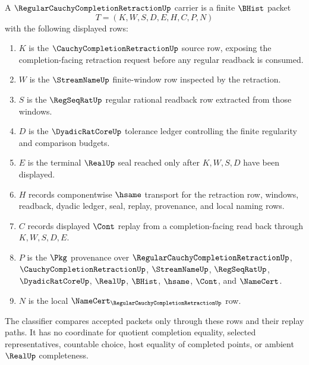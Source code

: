 \begin{definition}
\label{def:regular-cauchy-completion-retraction-carrier}
A $\RegularCauchyCompletionRetractionUp$ carrier is a finite $\BHist$ packet
$$
T=(K,W,S,D,E,H,C,P,N)
$$
with the following displayed rows:
\begin{enumerate}
\item $K$ is the $\CauchyCompletionRetractionUp$ source row, exposing the completion-facing retraction request before any regular readback is consumed.
\item $W$ is the $\StreamNameUp$ finite-window row inspected by the retraction.
\item $S$ is the $\RegSeqRatUp$ regular rational readback row extracted from those windows.
\item $D$ is the $\DyadicRatCoreUp$ tolerance ledger controlling the finite regularity and comparison budgets.
\item $E$ is the terminal $\RealUp$ seal reached only after $K,W,S,D$ have been displayed.
\item $H$ records componentwise $\hsame$ transport for the retraction row, windows, readback, dyadic ledger, seal, replay, provenance, and local naming rows.
\item $C$ records displayed $\Cont$ replay from a completion-facing read back through $K,W,S,D,E$.
\item $P$ is the $\Pkg$ provenance over $\RegularCauchyCompletionRetractionUp$, $\CauchyCompletionRetractionUp$, $\StreamNameUp$, $\RegSeqRatUp$, $\DyadicRatCoreUp$, $\RealUp$, $\BHist$, $\hsame$, $\Cont$, and $\NameCert$.
\item $N$ is the local $\NameCert_{\RegularCauchyCompletionRetractionUp}$ row.
\end{enumerate}
The classifier compares accepted packets only through these rows and their replay paths. It has no coordinate for quotient completion equality, selected representatives, countable choice, host equality of completed points, or ambient $\RealUp$ completeness.
\end{definition}

